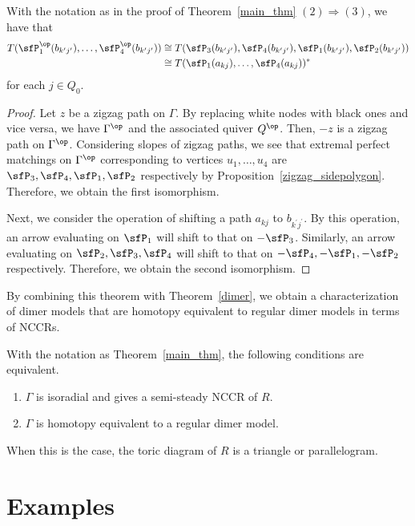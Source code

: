 \begin{lemm}\label{key_lem}
With the notation as in the proof of Theorem~\ref{main_thm} $(2)\Rightarrow(3)$, we have that
\begin{align*}
T(\sfP^{\op}_1(b_{k^\prime j^\prime}),\dots,\sfP^{\op}_4(b_{k^\prime j^\prime})) &\cong T(\sfP_3(b_{k^\prime j^\prime}),\sfP_4(b_{k^\prime j^\prime}),\sfP_1(b_{k^\prime j^\prime}),\sfP_2(b_{k^\prime j^\prime}))\\
&\cong T(\sfP_1(a_{kj}),\dots,\sfP_4(a_{kj}))^*
\end{align*}
for each $j\in Q_0$.
\end{lemm}

\begin{proof}
Let $z$ be a zigzag path on $\Gamma$. By replacing white nodes with black ones and vice versa, we have $\Gamma^{\op}$ and the associated quiver $Q^{\op}$. Then, $-z$ is a zigzag path on $\Gamma^{\op}$. Considering slopes of zigzag paths, we see that extremal perfect matchings on $\Gamma^{\op}$ corresponding to vertices $u_1,\dots,u_4$ are $\sfP_3, \sfP_4,\sfP_1,\sfP_2$ respectively by Proposition~\ref{zigzag_sidepolygon}. Therefore, we obtain the first isomorphism.

Next, we consider the operation of shifting a path $a_{kj}$ to $b_{k^\prime j^\prime}$. By this operation, an arrow evaluating on $\sfP_1$ will shift to that on $-\sfP_3$. Similarly, an arrow evaluating on $\sfP_2,\sfP_3,\sfP_4$ will shift to that on $-\sfP_4,-\sfP_1,-\sfP_2$ respectively. Therefore, we obtain the second isomorphism.
\end{proof}

By combining this theorem with Theorem~\ref{dimer}, we obtain a characterization of dimer models that are homotopy equivalent to regular dimer models in terms of NCCRs.

\begin{coro}\label{main_cor}
With the notation as Theorem~\ref{main_thm}, the following conditions are equivalent.
\begin{enumerate}[\rm (1)]
\item $\Gamma$ is isoradial and gives a semi-steady NCCR of $R$.
\item $\Gamma$ is homotopy equivalent to a regular dimer model.
\end{enumerate}
When this is the case, the toric diagram of $R$ is a triangle or parallelogram.
\end{coro}


\section{Examples}\label{subsec_ex}


